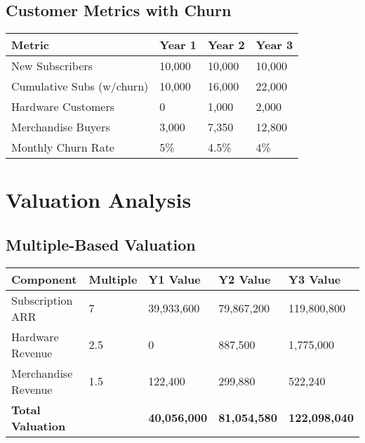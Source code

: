 \documentclass[11pt]{article}
\begin{document}
\subsection{Customer Metrics with Churn}
\begin{table}[htbp]
\centering
\begin{tabularx}{\linewidth}{l Y Y Y}
\toprule
Metric & Year 1 & Year 2 & Year 3 \\\midrule
New Subscribers & 10,000 & 10,000 & 10,000 \\
Cumulative Subs (w/churn) & 10,000 & 16,000 & 22,000 \\
Hardware Customers & 0 & 1,000 & 2,000 \\
Merchandise Buyers & 3,000 & 7,350 & 12,800 \\
Monthly Churn Rate & 5\% & 4.5\% & 4\% \\
\bottomrule
\end{tabularx}
\end{table}

\section{Valuation Analysis}

\subsection{Multiple-Based Valuation}
\begin{table}[htbp]
\centering
\begin{tabularx}{\linewidth}{l Y Y Y Y}
\toprule
Component & Multiple & Y1 Value & Y2 Value & Y3 Value \\\midrule
Subscription ARR & 7 & 39,933,600 & 79,867,200 & 119,800,800 \\
Hardware Revenue & 2.5 & 0 & 887,500 & 1,775,000 \\
Merchandise Revenue & 1.5 & 122,400 & 299,880 & 522,240 \\\midrule
\textbf{Total Valuation} &  & \textbf{40,056,000} & \textbf{81,054,580} & \textbf{122,098,040} \\
\bottomrule
\end{tabularx}
\end{table}

\end{document}
